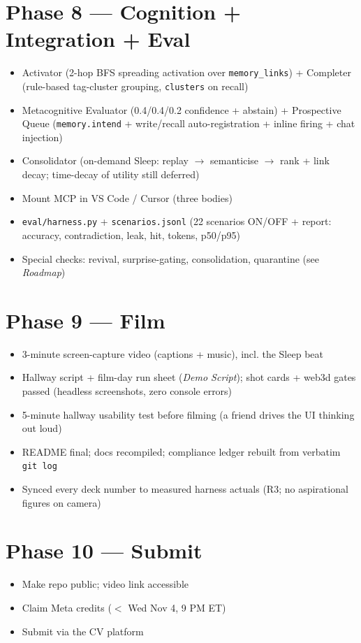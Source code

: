 \section{Phase 8 --- Cognition + Integration + Eval}
\begin{itemize}
  \item[$\boxtimes$] Activator (2-hop BFS spreading activation over \texttt{memory\_links}) + Completer (rule-based tag-cluster grouping, \texttt{clusters} on recall)
  \item[$\boxtimes$] Metacognitive Evaluator (0.4/0.4/0.2 confidence + abstain) + Prospective Queue (\texttt{memory.intend} + write/recall auto-registration + inline firing + chat injection)
  \item[$\boxtimes$] Consolidator (on-demand Sleep: replay $\rightarrow$ semanticise $\rightarrow$ rank + link decay; time-decay of utility still deferred)
  \item[$\square$] Mount MCP in VS Code / Cursor (three bodies)
  \item[$\boxtimes$] \texttt{eval/harness.py} + \texttt{scenarios.jsonl} (22 scenarios ON/OFF + report: accuracy, contradiction, leak, hit, tokens, p50/p95)
  \item[$\boxtimes$] Special checks: revival, surprise-gating, consolidation, quarantine (see \emph{Roadmap})
\end{itemize}

\section{Phase 9 --- Film}
\begin{itemize}
  \item[$\square$] 3-minute screen-capture video (captions + music), incl. the Sleep beat
  \item[$\boxtimes$] Hallway script + film-day run sheet (\emph{Demo Script}); shot cards + web3d gates passed (headless screenshots, zero console errors)
  \item[$\square$] 5-minute hallway usability test before filming (a friend drives the UI thinking out loud)
  \item[$\boxtimes$] README final; docs recompiled; compliance ledger rebuilt from verbatim \texttt{git log}
  \item[$\boxtimes$] Synced every deck number to measured harness actuals (R3; no aspirational figures on camera)
\end{itemize}

\section{Phase 10 --- Submit}
\begin{itemize}
  \item[$\square$] Make repo public; video link accessible
  \item[$\square$] Claim Meta credits ($<$ Wed Nov 4, 9 PM ET)
  \item[$\square$] Submit via the CV platform
\end{itemize}
